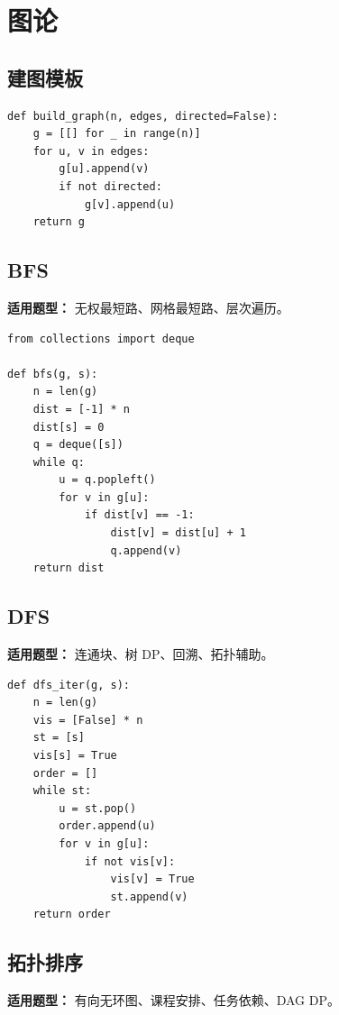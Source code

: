 \documentclass[UTF8,a4paper,14pt]{ctexart}
\begin{document}
\section{图论}

\subsection{建图模板}

\begin{lstlisting}
def build_graph(n, edges, directed=False):
    g = [[] for _ in range(n)]
    for u, v in edges:
        g[u].append(v)
        if not directed:
            g[v].append(u)
    return g
\end{lstlisting}

\subsection{BFS}

\textbf{适用题型：}
无权最短路、网格最短路、层次遍历。

\begin{lstlisting}
from collections import deque

def bfs(g, s):
    n = len(g)
    dist = [-1] * n
    dist[s] = 0
    q = deque([s])
    while q:
        u = q.popleft()
        for v in g[u]:
            if dist[v] == -1:
                dist[v] = dist[u] + 1
                q.append(v)
    return dist
\end{lstlisting}

\subsection{DFS}

\textbf{适用题型：}
连通块、树 DP、回溯、拓扑辅助。

\begin{lstlisting}
def dfs_iter(g, s):
    n = len(g)
    vis = [False] * n
    st = [s]
    vis[s] = True
    order = []
    while st:
        u = st.pop()
        order.append(u)
        for v in g[u]:
            if not vis[v]:
                vis[v] = True
                st.append(v)
    return order
\end{lstlisting}

\subsection{拓扑排序}

\textbf{适用题型：}
有向无环图、课程安排、任务依赖、DAG DP。
\end{document}
